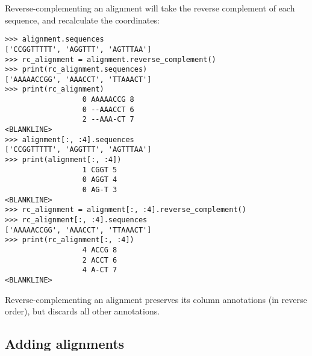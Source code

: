 Reverse-complementing an alignment will take the reverse complement of each sequence, and recalculate the coordinates:
\begin{verbatim}
>>> alignment.sequences
['CCGGTTTTT', 'AGGTTT', 'AGTTTAA']
>>> rc_alignment = alignment.reverse_complement()
>>> print(rc_alignment.sequences)
['AAAAACCGG', 'AAACCT', 'TTAAACT']
>>> print(rc_alignment)
                  0 AAAAACCG 8
                  0 --AAACCT 6
                  2 --AAA-CT 7
<BLANKLINE>
>>> alignment[:, :4].sequences
['CCGGTTTTT', 'AGGTTT', 'AGTTTAA']
>>> print(alignment[:, :4])
                  1 CGGT 5
                  0 AGGT 4
                  0 AG-T 3
<BLANKLINE>
>>> rc_alignment = alignment[:, :4].reverse_complement()
>>> rc_alignment[:, :4].sequences
['AAAAACCGG', 'AAACCT', 'TTAAACT']
>>> print(rc_alignment[:, :4])
                  4 ACCG 8
                  2 ACCT 6
                  4 A-CT 7
<BLANKLINE>
\end{verbatim}
Reverse-complementing an alignment preserves its column annotations (in reverse order), but discards all other annotations.

\subsection{Adding alignments}

